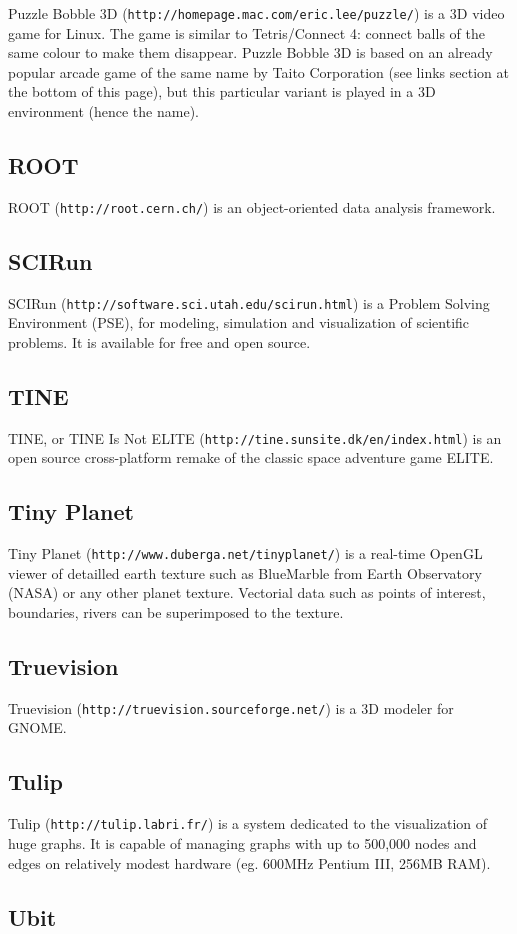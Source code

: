 Puzzle Bobble 3D ({\tt http://homepage.mac.com/eric.lee/puzzle/}) is a 3D video game for Linux. The game is similar to Tetris/Connect 4: connect balls of the same colour to make them disappear. Puzzle Bobble 3D is based on an already popular arcade game of the same name by Taito Corporation (see links section at the bottom of this page), but this particular variant is played in a 3D environment (hence the name).\subsection{ROOT}\label{ftgl-projects_root}
ROOT ({\tt http://root.cern.ch/}) is an object-oriented data analysis framework.\subsection{SCIRun}\label{ftgl-projects_scirun}
SCIRun ({\tt http://software.sci.utah.edu/scirun.html}) is a Problem Solving Environment (PSE), for modeling, simulation and visualization of scientific problems. It is available for free and open source.\subsection{TINE}\label{ftgl-projects_tine}
TINE, or TINE Is Not ELITE ({\tt http://tine.sunsite.dk/en/index.html}) is an open source cross-platform remake of the classic space adventure game ELITE.\subsection{Tiny Planet}\label{ftgl-projects_tinyplanet}
Tiny Planet ({\tt http://www.duberga.net/tinyplanet/}) is a real-time OpenGL viewer of detailled earth texture such as BlueMarble from Earth Observatory (NASA) or any other planet texture. Vectorial data such as points of interest, boundaries, rivers can be superimposed to the texture.\subsection{Truevision}\label{ftgl-projects_truevision}
Truevision ({\tt http://truevision.sourceforge.net/}) is a 3D modeler for GNOME.\subsection{Tulip}\label{ftgl-projects_tulip}
Tulip ({\tt http://tulip.labri.fr/}) is a system dedicated to the visualization of huge graphs. It is capable of managing graphs with up to 500,000 nodes and edges on relatively modest hardware (eg. 600MHz Pentium III, 256MB RAM).\subsection{Ubit}\label{ftgl-projects_ubit}
